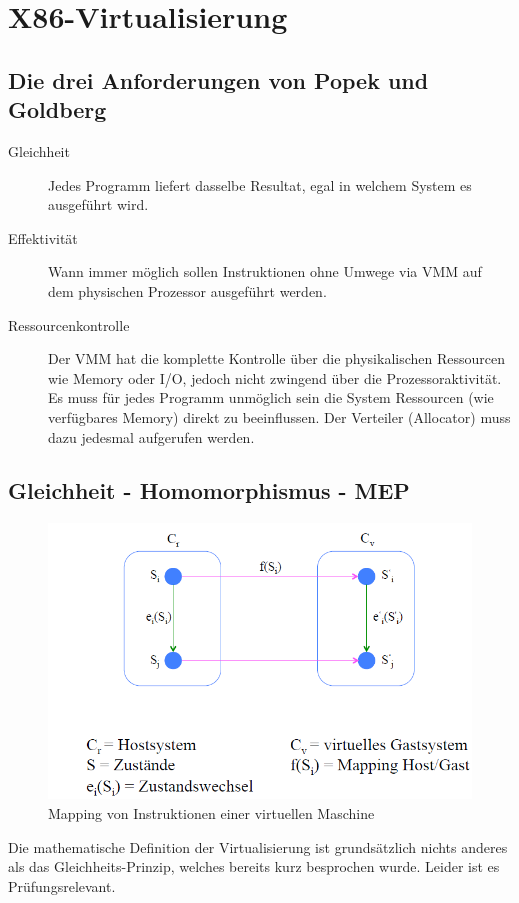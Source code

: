 \newpage
\section{X86-Virtualisierung}
\subsection{Die drei Anforderungen von Popek und Goldberg}
\label{sec:popek-goldberg-anforderungen}
\begin{description}
	\item[Gleichheit] Jedes Programm liefert dasselbe Resultat, egal in welchem System es ausgeführt wird.
	\item[Effektivität] Wann immer möglich sollen Instruktionen ohne Umwege via VMM auf dem physischen Prozessor ausgeführt werden.
	\item[Ressourcenkontrolle] Der VMM hat die komplette Kontrolle über die physikalischen Ressourcen wie Memory oder I/O, jedoch nicht zwingend über die Prozessoraktivität. Es muss für jedes Programm unmöglich sein die System Ressourcen (wie verfügbares Memory) direkt zu beeinflussen. Der Verteiler (Allocator) muss dazu jedesmal aufgerufen werden.
\end{description}

\subsection{Gleichheit - Homomorphismus - MEP}
\begin{figure}[]
\centering
\includegraphics[width=0.7\linewidth]{fig/popek_goldberg_mapping}
\caption{Mapping von Instruktionen einer virtuellen Maschine}
\label{fig:popek_goldberg_mapping}
\end{figure}
Die mathematische Definition der Virtualisierung ist grundsätzlich nichts anderes als das Gleichheits-Prinzip, welches bereits kurz besprochen wurde. Leider ist es Prüfungsrelevant.

